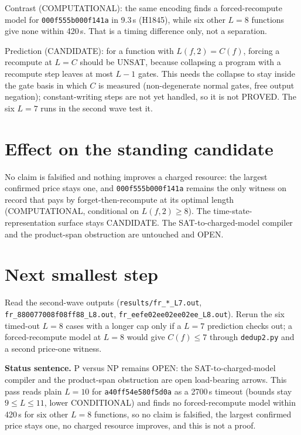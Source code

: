 \documentclass[11pt]{article}
\begin{document}
Contrast (COMPUTATIONAL): the same encoding finds a forced-recompute model for \texttt{000f555b000f141a} in 9.3\,s (H1845), while six other $L=8$ functions give none within 420\,s. That is a timing difference only, not a separation.

Prediction (CANDIDATE): for a function with $L(f,2)=C(f)$, forcing a recompute at $L=C$ should be UNSAT, because collapsing a program with a recompute step leaves at most $L-1$ gates. This needs the collapse to stay inside the gate basis in which $C$ is measured (non-degenerate normal gates, free output negation); constant-writing steps are not yet handled, so it is not PROVED. The six $L=7$ runs in the second wave test it.

\section*{Effect on the standing candidate}
No claim is falsified and nothing improves a charged resource: the largest confirmed price stays one, and \texttt{000f555b000f141a} remains the only witness on record that pays by forget-then-recompute at its optimal length (COMPUTATIONAL, conditional on $L(f,2)\ge 8$). The time-state-representation surface stays CANDIDATE. The SAT-to-charged-model compiler and the product-span obstruction are untouched and OPEN.

\section*{Next smallest step}
Read the second-wave outputs (\texttt{results/fr\_*\_L7.out}, \texttt{fr\_880077008f08ff88\_L8.out}, \texttt{fr\_eefe02ee02ee02ee\_L8.out}). Rerun the six timed-out $L=8$ cases with a longer cap only if a $L=7$ prediction checks out; a forced-recompute model at $L=8$ would give $C(f)\le 7$ through \texttt{dedup2.py} and a second price-one witness.

\bigskip
\noindent\textbf{Status sentence.} P versus NP remains OPEN: the SAT-to-charged-model compiler and the product-span obstruction are open load-bearing arrows. This pass reads plain $L=10$ for \texttt{a40ff54e580f5d0a} as a 2700\,s timeout (bounds stay $9\le L\le 11$, lower CONDITIONAL) and finds no forced-recompute model within 420\,s for six other $L=8$ functions, so no claim is falsified, the largest confirmed price stays one, no charged resource improves, and this is not a proof.
\end{document}
